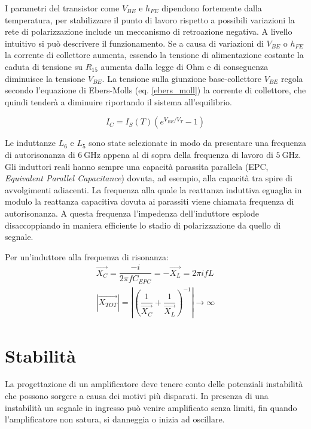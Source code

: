 \documentclass[12pt,oneside]{book}
\begin{document}
I parametri del transistor come $V_{BE}$ e $h_{FE}$ dipendono fortemente dalla temperatura, per stabilizzare il punto di lavoro rispetto a possibili variazioni la rete di polarizzazione include un meccanismo di retroazione negativa. A livello intuitivo si può descrivere il funzionamento. Se a causa di variazioni di $V_{BE}$ o $h_{FE}$ la corrente di collettore aumenta, essendo la tensione di alimentazione costante la caduta di tensione su $R_{15}$ aumenta dalla legge di Ohm e di conseguenza diminuisce la tensione $V_{BE}$. La tensione sulla giunzione base-collettore $V_{BE}$ regola secondo l'equazione di Ebers-Molls (eq. \eqref{ebers_moll}) la corrente di collettore, che quindi tenderà a diminuire riportando il sistema all'equilibrio.

\begin{equation}
    I_C=I_S(T)\left(e^{V_{BE}/V_T}-1\right)
    \label{ebers_moll}
\end{equation}

%


Le induttanze $L_6$ e $L_5$ sono state selezionate in modo da presentare una frequenza di autorisonanza di $\SI{6}{\giga\hertz}$ appena al di sopra della frequenza di lavoro di $\SI{5}{\giga\hertz}$. Gli induttori reali hanno sempre una capacità parassita parallela (EPC, \textit{Equivalent Parallel Capacitance}) dovuta, ad esempio, alla capacità tra spire di avvolgimenti adiacenti. La frequenza alla quale la reattanza induttiva eguaglia in modulo la reattanza capacitiva dovuta ai parassiti viene chiamata frequenza di autorisonanza. A questa frequenza l'impedenza dell'induttore esplode disaccoppiando in maniera efficiente lo stadio di polarizzazione da quello di segnale.

Per un'induttore alla frequenza di risonanza:
\begin{equation}
    \begin{split}
        \vec{X_C}=\dfrac{-i}{2\pi f C_{EPC}}=-\vec{X_L}=2 \pi i f L\\
        \left|\vec{X_{TOT}}\right|=\left|\left(\dfrac{1}{\vec{X_C}}+\dfrac{1}{\vec{X_L}}\right)^{-1}\right|\to\infty 
    \end{split}
\end{equation} 

\section{Stabilità}
La progettazione di un amplificatore deve tenere conto delle potenziali instabilità che possono sorgere a causa dei motivi più disparati. In presenza di una instabilità un segnale in ingresso può venire amplificato senza limiti, fin quando l'amplificatore non satura, si danneggia o inizia ad oscillare.
\end{document}
